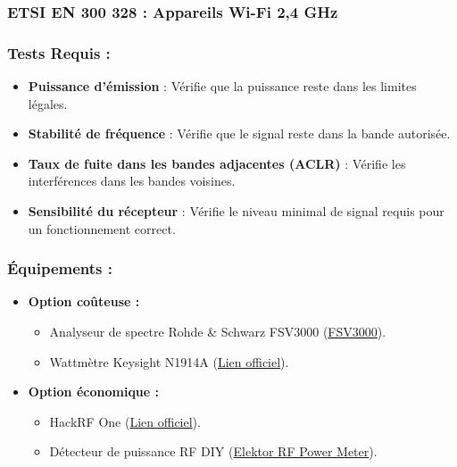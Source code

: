 \documentclass[a4paper,12pt]{article}
\begin{document}
\subsubsection{ETSI EN 300 328 : Appareils Wi-Fi 2,4 GHz}
\subsubsection*{Tests Requis :}
\begin{itemize}
    \item \textbf{Puissance d’émission} : Vérifie que la puissance reste dans les limites légales.
    \item \textbf{Stabilité de fréquence} : Vérifie que le signal reste dans la bande autorisée.
    \item \textbf{Taux de fuite dans les bandes adjacentes (ACLR)} : Vérifie les interférences dans les bandes voisines.
    \item \textbf{Sensibilité du récepteur} : Vérifie le niveau minimal de signal requis pour un fonctionnement correct.
\end{itemize}

\subsubsection*{Équipements :}
\begin{itemize}
    \item \textbf{Option coûteuse :}
          \begin{itemize}
              \item Analyseur de spectre Rohde \& Schwarz FSV3000 (\href{https://www.rohde-schwarz.com/product/FSV3000.html}{FSV3000}).
              \item Wattmètre Keysight N1914A (\href{https://www.keysight.com/us/en/product/N1914A.html}{Lien officiel}).
          \end{itemize}
    \item \textbf{Option économique :}
          \begin{itemize}
              \item HackRF One (\href{https://greatscottgadgets.com/hackrf/one/}{Lien officiel}).
              \item Détecteur de puissance RF DIY (\href{https://www.elektor.com/rf-power-meter}{Elektor RF Power Meter}).
          \end{itemize}
\end{itemize}
\end{document}
